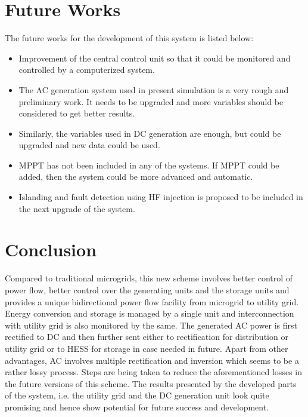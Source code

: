 \documentclass[journal,twoside]{IEEEtran}
\begin{document}
\section{Future Works}
The future works for the development of this system is
listed below:
\begin{itemize}
\item Improvement of the central control unit so that it
could be monitored and controlled by a
computerized system.
\item The AC generation system used in present
simulation is a very rough and preliminary work.
It needs to be upgraded and more variables should
be considered to get better results.
\item Similarly, the variables used in DC generation are
enough, but could be upgraded and new data could
be used.
\item MPPT has not been included in any of the systems.
If MPPT could be added, then the system could be
more advanced and automatic.
\item Islanding and fault detection using HF injection is
proposed to be included in the next upgrade of the
system.
\end{itemize}

\section{Conclusion}
Compared to traditional microgrids, this new
scheme involves better control of power flow, better
control over the generating units and the storage units
and provides a unique bidirectional power flow facility
from microgrid to utility grid.
Energy conversion and storage is managed by
a single unit and interconnection with utility grid is
also monitored by the same.
The generated AC power is first rectified to
DC and then further sent either to rectification for
distribution or utility grid or to HESS for storage in
case needed in future. Apart from other advantages, AC
involves multiple rectification and inversion which
seems to be a rather lossy process. Steps are being
taken to reduce the aforementioned losses in the future
versions of this scheme.
The results presented by the developed parts
of the system, i.e. the utility grid and the DC
generation unit look quite promising and hence show
potential for future success and development.
\end{document}
